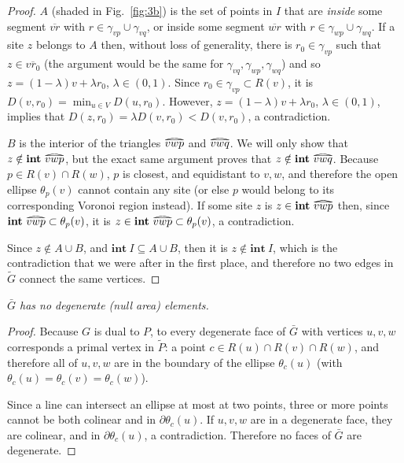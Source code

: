 \documentclass[11pt]{article}
\begin{document}
\begin{proof}
$A$ (shaded in Fig.~\ref{fig:3b}) is the set of points in $I$ that are \emph{inside} some segment
$\overline{vr}$ with $r\in\gamma_{vp}\cup\gamma_{vq}$, or inside
some segment $\overline{wr}$ with $r\in\gamma_{wp}\cup\gamma_{wq}$. 
If a site $z$ belongs to $A$ then, without loss of generality, there is $r_0\in\gamma_{vp}$ 
such that $z\in\overline{vr_0}$ 
(the argument would be the same for $\gamma_{vq},\gamma_{wp},\gamma_{wq}$) 
and so $z=(1-\lambda)v + \lambda r_0$, $\lambda\in(0,1)$. 
Since $r_0\in\gamma_{vp}\subset R(v)$, it is $D(v,r_0) = \displaystyle{\min_{u\in V}
D(u,r_0)}$. However, $z=(1-\lambda)v + \lambda r_0$, $\lambda\in(0,1)$, 
	implies that $D(z,r_0) = \lambda D(v,r_0) < D(v,r_0)$, a contradiction. 


$B$ is the interior of the triangles $\widetriangle{vwp}$ and
$\widetriangle{vwq}$. We will only show that $z\notin\mathbf{int\ }{\widetriangle{vwp}}$, but the 
exact same argument proves that $z\notin \mathbf{int\ }{\widetriangle{vwq}}$.
Because $p\in R(v)\cap R(w)$, $p$ is closest, and equidistant 
to $v,w$, and therefore the open ellipse $\theta_p(v)$ cannot contain any site (or else $p$ would
belong to its corresponding Voronoi region instead). 
If some site $z$ is $z\in\mathbf{int\ }{\widetriangle{vwp}}$ then, since
$\mathbf{int\ }{\widetriangle{vwp}}\subset\theta_p(v)$, it is 
$z\in\mathbf{int\ }{\widetriangle{vwp}}\subset\theta_p(v)$, a
contradiction. 

Since $z\notin A\cup B$, and $\mathbf{int\ }{I} \subseteq A\cup B$, then it is
$z\notin \mathbf{int\ }{I}$, which is the contradiction that we were after in the first
place, and therefore no two edges in $\tilde{G}$ connect the same vertices. 
\end{proof}



\emph{
	$\bar{G}$ has no degenerate (null area) elements. }
\begin{proof}
Because $G$ is dual to $P$, to every degenerate face of $\bar{G}$ with 
vertices $u,v,w$ corresponds a primal vertex in $\tilde{P}$: a point $c\in
R(u)\cap R(v)\cap R(w)$, and therefore
all of $u,v,w$ are in the boundary of the ellipse 
$\theta_c(u)$ (with $\theta_c(u)=\theta_c(v)=\theta_c(w)$). 

Since a line can intersect an ellipse at most at two points, 
three or more points cannot be both colinear and in $\partial\theta_c(u)$. 
If $u,v,w$ are in a degenerate face, they are colinear, and in $\partial\theta_c(u)$, a contradiction. 
Therefore no faces of $\bar{G}$ are degenerate. 
\end{proof}
\end{document}
